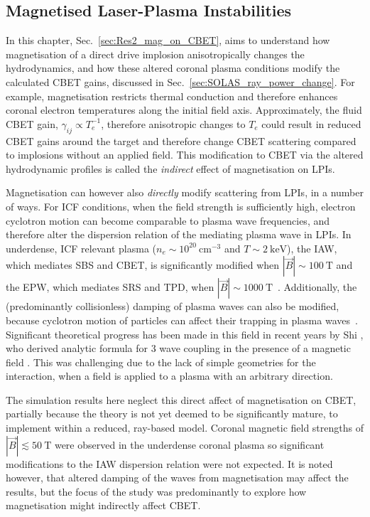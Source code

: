 \subsection{Magnetised Laser-Plasma Instabilities}%
\label{sec:Res2_maglpis}

In this chapter, Sec.~\ref{sec:Res2_mag_on_CBET}, aims to understand how magnetisation of a direct drive implosion anisotropically changes the hydrodynamics, and how these altered coronal plasma conditions modify the calculated \ac{CBET} gains, discussed in Sec.~\ref{sec:SOLAS_ray_power_change}.
For example, magnetisation restricts thermal conduction and therefore enhances coronal electron temperatures along the initial field axis.
Approximately, the fluid \ac{CBET} gain, $\gamma_{ij}\propto T_e^{-1}$, therefore anisotropic changes to $T_e$ could result in reduced \ac{CBET} gains around the target and therefore change \ac{CBET} scattering compared to implosions without an applied field.
This modification to \ac{CBET} via the altered hydrodynamic profiles is called the \textit{indirect} effect of magnetisation on \ac{LPIs}.

Magnetisation can however also \textit{directly} modify scattering from \ac{LPIs}, in a number of ways.
For \ac{ICF} conditions, when the field strength is sufficiently high, electron cyclotron motion can become comparable to plasma wave frequencies, and therefore alter the dispersion relation of the mediating plasma wave in \ac{LPIs}.
In underdense, \ac{ICF} relevant plasma ($n_e \sim 10^{20}\ \text{cm}^{-3}$ and $T\sim2\ \text{keV}$), the \ac{IAW}, which mediates \ac{SBS} and \ac{CBET}, is significantly modified when $|\vec{B}|\sim100\ \text{T}$ and the \ac{EPW}, which mediates \ac{SRS} and \ac{TPD}, when $|\vec{B}|\sim1000\ \text{T}$~\cite{shi_benchmarking_2023}.
Additionally, the (predominantly collisionless) damping of plasma waves can also be modified, because cyclotron motion of particles can affect their trapping in plasma waves~\cite{shi_benchmarking_2023}.
Significant theoretical progress has been made in this field in recent years by Shi , who derived analytic formula for 3 wave coupling in the presence of a magnetic field \cite{shi_three-wave_2017,shi_laser-plasma_2018}.
This was challenging due to the lack of simple geometries for the interaction, when a field is applied to a plasma with an arbitrary direction.

The simulation results here neglect this direct affect of magnetisation on \ac{CBET}, partially because the theory is not yet deemed to be significantly mature, to implement within a reduced, ray-based model.
Coronal magnetic field strengths of $|\vec{B}|\lesssim50\ \text{T}$ were observed in the underdense coronal plasma so significant modifications to the \ac{IAW} dispersion relation were not expected.
It is noted however, that altered damping of the waves from magnetisation may affect the results, but the focus of the study was predominantly to explore how magnetisation might indirectly affect \ac{CBET}.

